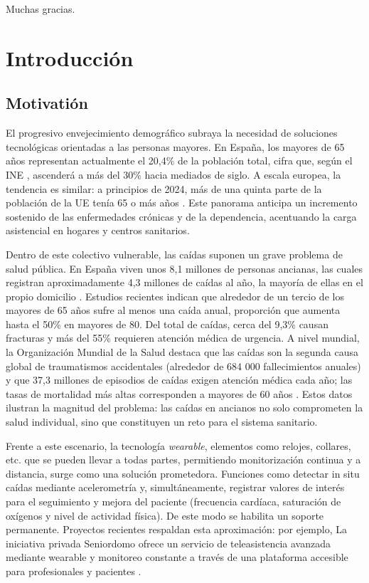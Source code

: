 \documentclass[12pt, a4paper]{article}
\begin{document}
\vspace{1em}

Muchas gracias.

\tableofcontents

\section{Introducción}

	\subsection{Motivatión}
    
    El progresivo envejecimiento demográfico subraya la necesidad de soluciones tecnológicas orientadas a las personas mayores. En España, los mayores de 65 años representan actualmente el 20,4\% de la población total, cifra que, según el INE \cite{INE2024}, ascenderá a más del 30\% hacia mediados de siglo. A escala europea, la tendencia es similar: a principios de 2024, más de una quinta parte de la población de la UE tenía 65 o más años \cite{Euro2025}. Este panorama anticipa un incremento sostenido de las enfermedades crónicas y de la dependencia, acentuando la carga asistencial en hogares y centros sanitarios.
    
    Dentro de este colectivo vulnerable, las caídas suponen un grave problema de salud pública. En España viven unos 8,1 millones de personas ancianas, las cuales registran aproximadamente 4,3 millones de caídas al año, la mayoría de ellas en el propio domicilio \cite{Rodriguez2015}. Estudios recientes indican que alrededor de un tercio de los mayores de 65 años sufre al menos una caída anual, proporción que aumenta hasta el 50\% en mayores de 80. Del total de caídas, cerca del 9,3\% causan fracturas y más del 55\% requieren atención médica de urgencia. A nivel mundial, la Organización Mundial de la Salud destaca que las caídas son la segunda causa global de traumatismos accidentales (alrededor de 684 000 fallecimientos anuales) y que 37,3 millones de episodios de caídas exigen atención médica cada año; las tasas de mortalidad más altas corresponden a mayores de 60 años \cite{OMS2021}. Estos datos ilustran la magnitud del problema: las caídas en ancianos no solo comprometen la salud individual, sino que constituyen un reto para el sistema sanitario.
    
    Frente a este escenario, la tecnología \emph{wearable}, elementos como relojes, collares, etc. que se pueden llevar a todas partes, permitiendo monitorización continua y a distancia, surge como una solución prometedora. Funciones como detectar in situ caídas mediante acelerometría y, simultáneamente, registrar valores de interés para el seguimiento y mejora del paciente (frecuencia cardíaca, saturación de oxígenos y nivel de actividad física). De este modo se habilita un soporte permanente. Proyectos recientes respaldan esta aproximación: por ejemplo, La iniciativa privada Seniordomo ofrece un servicio de teleasistencia avanzada mediante wearable y monitoreo constante a través de una plataforma accesible para profesionales y pacientes \cite{seniordomo}. 
    
\end{document}
